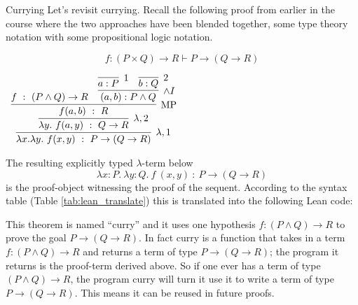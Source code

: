 \documentclass{book}
\begin{document}
    \begin{eg}{Currying} Let's revisit currying. Recall the following proof from earlier in the course where the two approaches have been blended together, some type theory notation with some propositional logic notation.

    $$f : (P\times Q) \rightarrow  R \vdash  P \rightarrow (Q \rightarrow  R)$$		    
        \begin{center}
            $\begin{array}{c}
                \infer[\lambda,1]{\lambda x. \lambda y. \ f(x,y) \ : \ P\to(Q\to R)}
                    {\infer[\lambda,2]{\lambda y. \ f(a,y) \ : \ Q\to R}
                        {\infer[\MP]{f(a,b) \ : \ R}
                            {f \ : \ (P\land Q) \to R
                            &
                            \infer[\land I]{(a,b) : P\land Q}
                                {\infer[1]{a:P}{}
                                &
                                \infer[2]{b:Q}{}}}}}
            \end{array}$
        \end{center}    

    The resulting explicitly typed $\lambda$-term below
    $$ \lambda x : P. \ \lambda y : Q. \ f \ (x,y) \ : \ P \to (Q \to R)$$
    is the proof-object witnessing the proof of the sequent. According to the syntax table (Table \ref{tab:lean_translate}) this is translated into the following Lean code:
%
%

    This theorem is named ``curry'' and it uses one hypothesis $f : (P \land Q) \to R$ to prove the goal $P \to (Q \to R)$. In fact curry is a function that takes in a term $f : (P \land Q) \to R$ and returns a term of type $P \to (Q \to R)$; the program it returns is the proof-term derived above. So if one ever has a term of type $(P \land Q) \to R$, the program curry will turn it use it to write a term of type $P \to (Q \to R)$. This means it can be reused in future proofs.
    \end{eg}

%
\end{document}
